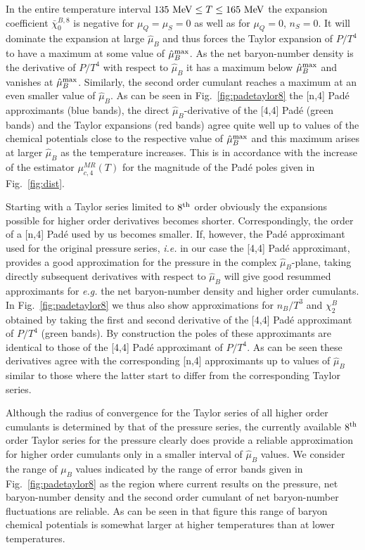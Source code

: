 \documentclass[pdflatex,prd,twocolumn,showpacs,superscriptaddress,nofootinbib]{revtex4-1}
\newcommand \hmu {\hat{\mu}}
\newcommand \cb {\bar{\chi}}
\begin{document}
In the entire temperature interval 
$135~{\rm MeV}\le T\le  165~{\rm MeV}$ the expansion 
coefficient $\cb_0^{B,8}$ is negative for $\mu_Q=\mu_S=0$ as well as for $\mu_Q=0$, $n_S=0$. 
It will dominate 
the expansion at large $\hmu_B$ and thus forces 
the Taylor expansion of $P/T^4$ to have a maximum at
some value of $\hmu_B^{\rm max}$. As the net baryon-number density is the derivative of $P/T^4$ with respect
to $\hmu_B$ it has a maximum below $\hmu_B^{\rm max}$ and
vanishes at $\hmu_B^{\rm max}$. Similarly, the 
second order cumulant reaches a maximum at an even smaller value of $\hmu_B$.
As can be seen in Fig.~\ref{fig:padetaylor8} the [n,4] Pad\'e approximants (blue bands), the direct $\hmu_B$-derivative of the [4,4] Pad\'e (green bands) and the Taylor expansions (red bands) agree quite well up to values of the chemical potentials
close to the respective value of $\hmu_B^{\rm max}$ and this maximum arises at larger $\hmu_B$ as the
temperature increases. This is in accordance with the
increase of the estimator $\mu_{c,4}^{MR} (T)$ for 
the magnitude of the Pad\'e poles given in Fig.~\ref{fig:dist}.

Starting with a Taylor series limited to $8^{\rm th}$ order obviously the expansions possible for higher order
derivatives becomes shorter. Correspondingly, the
order of a [n,4] Pad\'e used by us becomes smaller. If,
however, the Pad\'e approximant used for the original 
pressure series, {\it i.e.} in our case the [4,4]
Pad\'e approximant, provides a good approximation for
the pressure in the complex $\hmu_B$-plane, taking
directly subsequent derivatives with respect to $\hmu_B$
will give good resummed approximants for {\it e.g.}
the net baryon-number density and higher order cumulants. In Fig.~\ref{fig:padetaylor8} we thus also
show approximations for $n_B/T^3$ and $\chi_2^B$
obtained by taking the first and second derivative 
of the [4,4] Pad\'e approximant of $P/T^4$ (green bands). By construction the poles of these approximants
are identical to those of the [4,4] Pad\'e approximant of $P/T^4$. As can be seen these derivatives agree with 
the corresponding [n,4] approximants up to values of
$\hmu_B$ similar to those where the latter start to 
differ from the corresponding Taylor series. 

Although the radius of convergence for the Taylor series 
of all higher order cumulants is determined by that of the
pressure series, the currently available $8^{\rm th}$ order
Taylor series for the pressure clearly does provide a reliable
approximation for higher order cumulants only in a smaller 
interval of $\hmu_B$ values. We consider the range of $\mu_B$ values
indicated by the range of error bands given in Fig.~\ref{fig:padetaylor8} as the region where current results
on the pressure, net baryon-number density and the second order
cumulant of net baryon-number fluctuations are reliable. As can
be seen in that figure this range of baryon chemical potentials 
is somewhat larger at higher temperatures than at 
lower temperatures.
\end{document}
